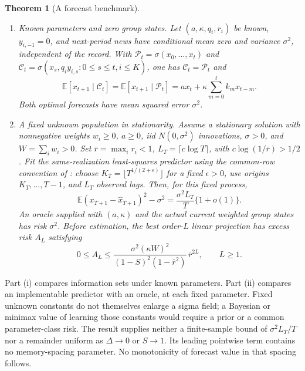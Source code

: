 \documentclass[12pt]{article}
\newtheorem{theorem}{Theorem}[section]
\theoremstyle{definition}
\theoremstyle{remark}
\begin{document}
\begin{theorem}[A forecast benchmark]\label{n:irr}
\begin{enumerate}[label=(\roman*),itemsep=1pt]
\item \emph{Known parameters and zero group states.} Let $(a,\kappa,q_i,r_i)$ be known, $y_{i,-1}=0$, and next-period news have conditional mean zero and variance $\sigma^2$, independent of the record. With $\mathcal P_t=\sigma(x_0,\ldots,x_t)$ and $\mathcal C_t=\sigma(x_s,q_i y_{i,s}:0\le s\le t, i\le K)$, one has $\mathcal C_t=\mathcal P_t$ and
\[
\mathbb E[x_{t+1}\mid\mathcal C_t]=\mathbb E[x_{t+1}\mid\mathcal P_t]
=a x_t+\kappa\sum_{m=0}^t k_m x_{t-m}.
\]
Both optimal forecasts have mean squared error $\sigma^2$.
\item \emph{A fixed unknown population in stationarity.} Assume a stationary solution with nonnegative weights $w_i \ge 0$, $a \ge 0$, iid $N(0,\sigma^2)$ innovations, $\sigma>0$, and $W=\sum_iw_i>0$. Set $\bar r=\max_i r_i<1$, $L_T=\lceil c\log T\rceil$, with $c\log(1/\bar r)>1/2$. Fit the same-realization least-squares predictor using the common-row convention of \citet[Proposition~2]{ingwei2005}: choose $K_T=\lfloor T^{1/(2+\epsilon)}\rfloor$ for a fixed $\epsilon>0$, use origins $K_T,\ldots,T-1$, and $L_T$ observed lags. Then, for this fixed process,
\[
\mathbb E(x_{T+1}-\hat x_{T+1})^2-\sigma^2
=\frac{\sigma^2 L_T}{T}\{1+o(1)\}.
\]
An oracle supplied with $(a,\kappa)$ and the actual current weighted group states has risk $\sigma^2$. Before estimation, the best order-$L$ linear projection has excess risk $A_L$ satisfying
\[
0\le A_L\le
\frac{\sigma^2(\kappa W)^2}{(1-S)^2(1-\bar r^2)}\,\bar r^{2L},\qquad L\ge1.
\]
\end{enumerate}
\end{theorem}

Part (i) compares information sets under known parameters. Part (ii) compares an implementable predictor with an oracle, at each fixed parameter. Fixed unknown constants do not themselves enlarge a sigma field; a Bayesian or minimax value of learning those constants would require a prior or a common parameter-class risk. The result supplies neither a finite-sample bound of $\sigma^2L_T/T$ nor a remainder uniform as $\Delta\to0$ or $S\to1$. Its leading pointwise term contains no memory-spacing parameter. No monotonicity of forecast value in that spacing follows.
\end{document}
